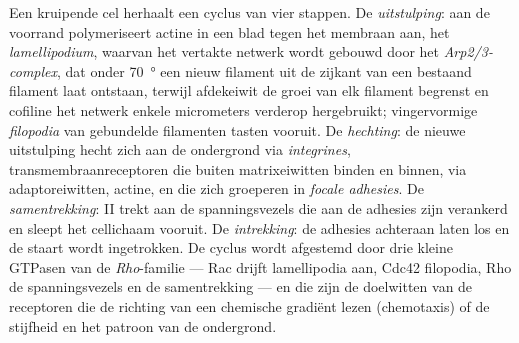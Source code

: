 \begin{definition}[Celmigratie]\label{def:b3:cytoskeleton-motility:migration}
Een kruipende cel herhaalt een cyclus van vier stappen. De
\emph{uitstulping}: aan de voorrand polymeriseert actine in een blad
tegen het membraan aan, het \emph{lamellipodium}, waarvan het vertakte
netwerk wordt gebouwd door het \emph{Arp2/3-complex}, dat onder
\qty{70}{\degree} een nieuw filament uit de zijkant van een bestaand
filament laat ontstaan, terwijl afdekeiwit de groei van elk filament
begrenst en cofiline het netwerk enkele micrometers verderop
hergebruikt; vingervormige \emph{filopodia} van gebundelde filamenten
tasten vooruit. De \emph{hechting}: de nieuwe uitstulping hecht zich
aan de ondergrond via \emph{integrines}, transmembraanreceptoren die
buiten matrixeiwitten binden en binnen, via adaptoreiwitten, actine, en
die zich groeperen in \emph{focale adhesies}. De \emph{samentrekking}:
 II trekt aan de spanningsvezels die aan de adhesies zijn
verankerd en sleept het cellichaam vooruit. De \emph{intrekking}: de
adhesies achteraan laten los en de staart wordt ingetrokken. De cyclus
wordt afgestemd door drie kleine GTPasen van de \emph{Rho}-familie ---
Rac drijft lamellipodia aan, Cdc42 filopodia, Rho de spanningsvezels en
de samentrekking --- en die zijn de doelwitten van de receptoren die de
richting van een chemische gradiënt lezen (chemotaxis) of de stijfheid
en het patroon van de ondergrond.
\end{definition}

